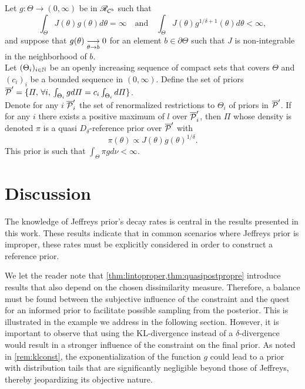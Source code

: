 \begin{thm}\label{thm:quasipostpropre}
    Let $g:\Theta\to(0,\infty)$ be in $\mathscr{R}_{\mathcal{C}^b}$ such that
    \begin{equation}
        \int_\Theta J(\theta)g(\theta)d\theta=\infty\quad\text{and}\quad \int_\Theta J(\theta)g^{1/\delta+1}(\theta)d\theta<\infty,
    \end{equation}
and suppose that $g(\theta)\overset{\ }{\underset{\theta\rightarrow b}{\longrightarrow}}0$ for an element $b\in\partial\Theta$ such that $J$ is non-integrable in the neighborhood of $b$.\\
Let $(\Theta_i)_{i\in\mathbb{N}}$ be an openly increasing sequence of compact sets that covers $\Theta$ and $(c_i)_i$ be a bounded sequence in $(0,\infty)$. Define the set of priors  $\overline{\mathcal{P}}'=\{\varPi,\,\forall i,\,\int_{\Theta_i} gd\varPi=c_i\int_{\Theta_i}d\varPi\}$.\\ %
Denote for any $i$ $\overline{\mathcal{P}}'_i$ the set of renormalized restrictions to $\Theta_i$ of priors in $\overline{\mathcal{P}}'$. If for any $i$ there exists a  positive maximum of $l$ over $\overline{\mathcal{P}}'_i$, then  $\varPi$ whose density is denoted $\pi$ is a quasi $D_\delta$-reference prior over $\overline{\mathcal{P}}'$ with
    \begin{equation}
        \pi(\theta)\propto J(\theta)g(\theta)^{1/\delta}.
    \end{equation}
    This prior is such that $\int_\Theta\pi gd\nu<\infty$.
\end{thm}




\section{Discussion}\label{sec:BA:discu}

The knowledge of Jeffreys prior's decay rates is central in the results presented in this work. These results indicate that in common scenarios where Jeffreys prior is improper, these rates must be explicitly considered in order to construct a reference prior. 

We let the reader note that \cref{thm:lintoproper,thm:quasipostpropre} introduce results that also depend on the chosen dissimilarity measure. Therefore, a balance must be found between the subjective influence of the constraint and the quest for an informed prior to facilitate possible sampling from the posterior. This is illustrated in the example we address in the following section.
However, it is important to observe that using the KL-divergence instead of a $\delta$-divergence %
would result in a stronger influence of the constraint on the final prior. As noted in \cref{rem:klconst}, the exponentialization of the function $g$ could lead to a prior with distribution tails that are significantly negligible beyond those of Jeffreys, thereby jeopardizing its objective nature.

